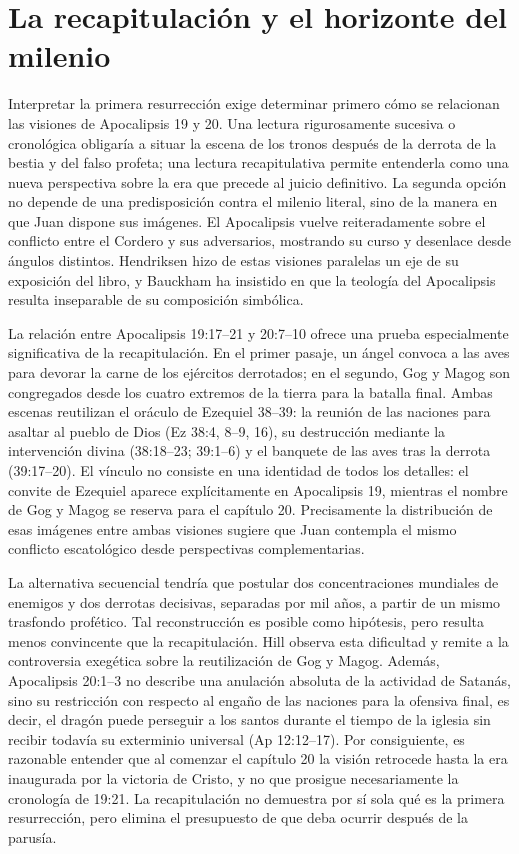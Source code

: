 
\section{La recapitulación y el horizonte del milenio}

Interpretar la primera resurrección exige determinar primero cómo se relacionan las visiones de Apocalipsis 19 y 20.
Una lectura rigurosamente sucesiva o cronológica obligaría a situar la escena de los tronos después de la derrota de la bestia y del falso profeta; una lectura recapitulativa permite entenderla como una nueva perspectiva sobre la era que precede al juicio definitivo.
La segunda opción no depende de una predisposición contra el milenio literal, sino de la manera en que Juan dispone sus imágenes.
El Apocalipsis vuelve reiteradamente sobre el conflicto entre el Cordero y sus adversarios, mostrando su curso y desenlace desde ángulos distintos.
Hendriksen hizo de estas visiones paralelas un eje de su exposición del libro, y Bauckham ha insistido en que la teología del Apocalipsis resulta inseparable de su composición simbólica. \autocite{hendriksen1998,bauckham1993}

La relación entre Apocalipsis 19:17--21 y 20:7--10 ofrece una prueba especialmente significativa de la recapitulación.
En el primer pasaje, un ángel convoca a las aves para devorar la carne de los ejércitos derrotados; en el segundo, Gog y Magog son congregados desde los cuatro extremos de la tierra para la batalla final.
Ambas escenas reutilizan el oráculo de Ezequiel 38--39: la reunión de las naciones para asaltar al pueblo de Dios (Ez 38:4, 8--9, 16), su destrucción mediante la intervención divina (38:18--23; 39:1--6) y el banquete de las aves tras la derrota (39:17--20).
El vínculo no consiste en una identidad de todos los detalles: el convite de Ezequiel aparece explícitamente en Apocalipsis 19, mientras el nombre de Gog y Magog se reserva para el capítulo 20.
Precisamente la distribución de esas imágenes entre ambas visiones sugiere que Juan contempla el mismo conflicto escatológico desde perspectivas complementarias. \autocite{beale1999,koester2014}

La alternativa secuencial tendría que postular dos concentraciones mundiales de enemigos y dos derrotas decisivas, separadas por mil años, a partir de un mismo trasfondo profético.
Tal reconstrucción es posible como hipótesis, pero resulta menos convincente que la recapitulación.
Hill observa esta dificultad y remite a la controversia exegética sobre la reutilización de Gog y Magog. \autocite{hill2016}
Además, Apocalipsis 20:1--3 no describe una anulación absoluta de la actividad de Satanás, sino su restricción con respecto al engaño de las naciones para la ofensiva final, es decir, el dragón puede perseguir a los santos durante el tiempo de la iglesia sin recibir todavía su exterminio universal (Ap 12:12--17).
Por consiguiente, es razonable entender que al comenzar el capítulo 20 la visión retrocede hasta la era inaugurada por la victoria de Cristo, y no que prosigue necesariamente la cronología de 19:21.
La recapitulación no demuestra por sí sola qué es la primera resurrección, pero elimina el presupuesto de que deba ocurrir después de la parusía.

